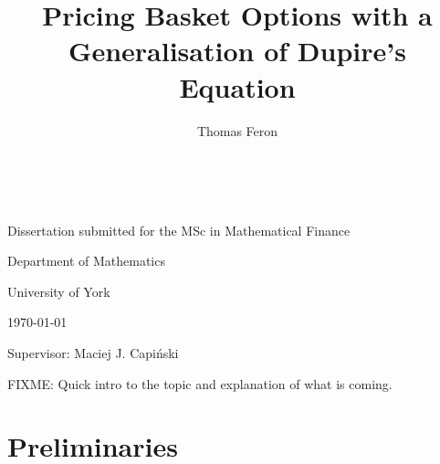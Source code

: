\documentclass[english]{article}
\numberwithin{equation}{section}
\numberwithin{figure}{section}
\theoremstyle{bolddescit}
\theoremstyle{definition}
\theoremstyle{definition}
\theoremstyle{plain}
\theoremstyle{plain}
\theoremstyle{bolddesc}
\theoremstyle{plain}
\theoremstyle{remark}
\begin{document}
\title{Pricing Basket Options with a Generalisation of Dupire's Equation}
\author{Thomas Feron}
\date{~}

\maketitle
\vspace{2.5in}

\noindent \begin{center}
Dissertation submitted for the MSc in Mathematical Finance
\par\end{center}

\begin{center}
\bigskip{}
\par\end{center}

\begin{center}
Department of Mathematics

University of York\bigskip{}
\par\end{center}

\begin{center}
\today
\par\end{center}

\vspace{1in}

\begin{center}
Supervisor: Maciej J. Capi\'nski
\par\end{center}

\newpage{}

\tableofcontents{}\newpage{}

\pagebreak

FIXME: Quick intro to the topic and explanation of what is coming.

\section{Preliminaries}

\end{document}
